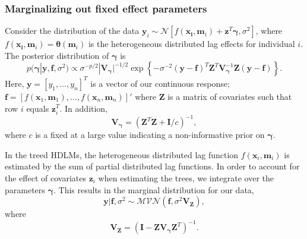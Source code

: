 \documentclass[12pt]{article}
\begin{document}
\subsubsection{Marginalizing out fixed effect parameters}
Consider the distribution of the data $\mathbf{y}_i\sim\mathcal{N}[f(\mathbf{x_i},\mathbf{m}_i)+\mathbf{z}^T\boldsymbol\gamma,\sigma^2]$, where $f(\mathbf{x_i},\mathbf{m}_i)=\boldsymbol\theta(\mathbf{m}_i)$ is the heterogeneous distributed lag effects for individual $i$. The posterior distribution of $\boldsymbol\gamma$ is
\begin{equation}
    p(\boldsymbol\gamma|\mathbf{y},\mathbf{f},\sigma^2)\propto
    \sigma^{-p/2}|\mathbf{V}_{\boldsymbol\gamma}|^{-1/2}
    \exp\left\{-\sigma^{-2}(\mathbf{y}-\mathbf{f})^T\mathbf{Z}^T\mathbf{V}_{\boldsymbol\gamma}^{-1}\mathbf{Z}(\mathbf{y}-\mathbf{f})\right\}.
\end{equation}
Here, $\mathbf{y}=[y_1,\ldots,y_n]^T$ is a vector of our continuous response; $\mathbf{f}=[f(\mathbf{x}_1,\mathbf{m}_1),\ldots,f(\mathbf{x}_n,\mathbf{m}_n)]'$ where $\mathbf{Z}$ is a matrix of covariates such that row $i$ equals $\mathbf{z}_i^T$. In addition,
\begin{equation}\label{eq:Vgamma}
    \mathbf{V}_{\boldsymbol{\gamma}}=(\mathbf{Z}^T\mathbf{Z}+\mathbf{I}/c)^{-1},
\end{equation}
where $c$ is a fixed at a large value indicating a non-informative prior on $\boldsymbol\gamma$.

In the treed HDLMs, the heterogeneous distributed lag function $f(\mathbf{x}_i,\mathbf{m}_i)$ is estimated by the sum of partial distributed lag functions. In order to account for the effect of covariates $\mathbf{z}_i$ when estimating the trees, we integrate over the parameters $\boldsymbol\gamma$. This results in the marginal distribution for our data,
\begin{equation}
    \mathbf{y}|\mathbf{f},\sigma^2\sim\mathcal{MVN}(\mathbf{f},\sigma^2\mathbf{V}_{\mathbf{Z}}),
\end{equation}
where
\begin{equation}
    \mathbf{V}_{\mathbf{Z}}=(\mathbf{I}-\mathbf{Z}\mathbf{V}_{\boldsymbol\gamma}\mathbf{Z}^T)^{-1}.
\end{equation}
\end{document}
